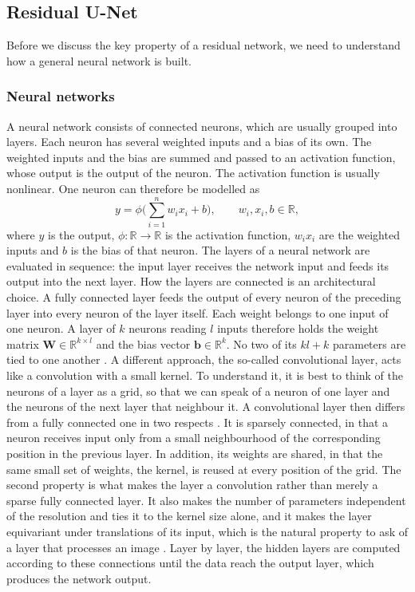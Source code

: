 \documentclass{article}
\numberwithin{equation}{section}
\begin{document}
\subsection{Residual U-Net}\label{sec:resunet}
Before we discuss the key property of a residual network, we need to understand how a general neural network is built.
\subsubsection{Neural networks}
A neural network consists of connected neurons, which are usually grouped into layers.
Each neuron has several weighted inputs and a bias of its own. The weighted inputs and the bias are summed and passed to an activation function, whose output is the output of the neuron.
The activation function is usually nonlinear. One neuron can therefore be modelled as
\[y = \phi\Big(\sum_{i=1}^n w_i x_i + b\Big),\qquad w_i,x_i,b\in\mathbb{R},\]
where $y$ is the output, $\phi:\mathbb{R}\to\mathbb{R}$ is the activation function, $w_i x_i$ are the weighted inputs and $b$ is the bias of that neuron.
The layers of a neural network are evaluated in sequence: the input layer receives the network input and feeds its output into the next layer. How the layers are connected is an architectural choice.
A fully connected layer feeds the output of every neuron of the preceding layer into every neuron of the layer itself. Each weight belongs to one input of one neuron. A layer of $k$ neurons reading $l$ inputs therefore holds the weight matrix $\mathbf{W}\in\mathbb{R}^{k\times l}$ and the bias vector $\mathbf{b}\in\mathbb{R}^{k}$. No two of its $kl+k$ parameters are tied to one another \parencite{Goodfellow}.
A different approach, the so-called convolutional layer, acts like a convolution with a small kernel.
To understand it, it is best to think of the neurons of a layer as a grid, so that we can speak of a neuron of one layer and the neurons of the next layer that neighbour it.
A convolutional layer then differs from a fully connected one in two respects \parencite{Goodfellow}. It is sparsely connected, in that a neuron receives input only from a small neighbourhood of the corresponding position in the previous layer. In addition, its weights are shared, in that the same small set of weights, the kernel, is reused at every position of the grid.
The second property is what makes the layer a convolution rather than merely a sparse fully connected layer. It also makes the number of parameters independent of the resolution and ties it to the kernel size alone, and it makes the layer equivariant under translations of its input, which is the natural property to ask of a layer that processes an image \parencite{LeCun1998}.
Layer by layer, the hidden layers are computed according to these connections until the data reach the output layer, which produces the network output.\\
\end{document}
